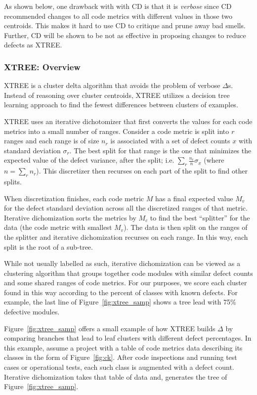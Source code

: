 \documentclass{sig-alternate}
\newcommand{\fig}[1]{Figure~\ref{fig:#1}}
\theoremstyle{break}
\begin{document}
As shown below, one drawback with with CD is that it is {\em verbose}
since
CD   recommended changes to all code
metrics with different values in those two centroids. 
This makes it hard to use CD to   critique and prune away bad smells. Further, CD will be shown to be
not as effective
in proposing changes to reduce defects as XTREE.

\subsubsection{XTREE: Overview}

  XTREE  is a cluster delta algorithm
  that avoids the problem of verbose $\Delta$s.
  Instead of reasoning over cluster centroids,
  XTREE utilizes a decision tree learning approach
  to find the fewest differences between clusters of examples.
  
  
 XTREE uses an iterative dichotomizer that
first converts the values for each code
metrics into a small number of ranges.
Consider a code metric is split into $r$ ranges and each range is of
  size
    $n_r$ is
  associated with a set of defect counts $x$ with standard deviation
  $\sigma_r$.
  The best split for that range is
  the one that minimizes the expected value of the
  defect variance, after the split; i.e.
  $\sum_r\frac{n_r}{n}\sigma_x$ (where $n=\sum_r n_r$).
  This discretizer then recurses on each part of the split
  to find other splits. 
  
  When discretization finishes, each code metric $M$ has a 
  final expected value $M_v$ for the defect standard deviation 
  across all the discretized ranges of that metric.
  Iterative dichomization sorts the metrics by $M_c$
  to find the best ``splitter'' for the data
  (the code metric with smallest $M_v$). The data
  is then split on the ranges of the splitter and
  iterative dichomization recurses on each range.  In this way,
  each split is the root of a sub-tree.
  

 
  While not usually labelled as such, iterative dichomization can
  be viewed as a clustering algorithm that groups together code modules
  with similar defect counts and some shared ranges of code metrics.
  For our purposes, we score each cluster found in this way according
  to the percent of classes with known defects. For example,
  the last line of \fig{xtree_samp} shows a tree lead with 75\%
  defective modules.
  
 \fig{xtree_samp} offers
  a small example of how XTREE builds
    $\Delta$ by comparing branches that lead to leaf clusters
  with different defect percentages. In this example, assume a project with a table of code metrics data describing its classes in the form of \fig{ck}. After code inspections and running test cases or operational
      tests, each such class is augmented with a defect count.
       Iterative dichomization takes that table of data and, 
        generates the tree of \fig{xtree_samp}.
        
\end{document}
